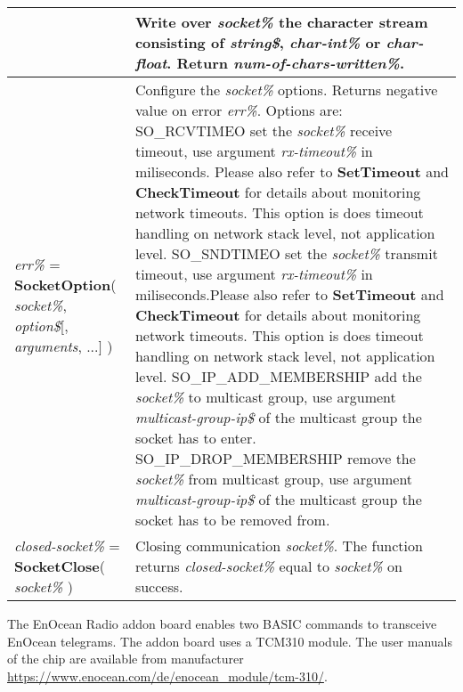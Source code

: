 \begin{table}[h!]
\begin{tabular}{|p{4cm}|p{10cm}|}
& Write over  \textit{socket\%} the character stream consisting of \textit{string\$}, \textit{char-int\%} or \textit{char-float}. Return \textit{num-of-chars-written\%}.
\\ \hline
\textit{err\%} = \textbf{SocketOption}( \textit{socket\%}, \textit{option\$}[, \textit{arguments}, ...] )
& Configure the \textit{socket\%} options. Returns negative value on error \textit{err\%}.\newline
Options are:\newline
SO\_RCVTIMEO set the \textit{socket\%} receive timeout, use argument \textit{rx-timeout\%} in miliseconds. Please also refer to \textbf{SetTimeout} and \textbf{CheckTimeout} for details about monitoring network timeouts. This option is does timeout handling on network stack level, not application level.\newline
SO\_SNDTIMEO set the \textit{socket\%} transmit timeout, use argument \textit{rx-timeout\%} in miliseconds.Please also refer to \textbf{SetTimeout} and \textbf{CheckTimeout} for details about monitoring network timeouts. This option is does timeout handling on network stack level, not application level.\newline
SO\_IP\_ADD\_MEMBERSHIP add the \textit{socket\%} to multicast group, use argument \textit{multicast-group-ip\$} of the multicast group the socket has to enter.\newline
SO\_IP\_DROP\_MEMBERSHIP remove the \textit{socket\%} from multicast group, use argument \textit{multicast-group-ip\$} of the multicast group the socket has to be removed from.\newline
\\ \hline
\textit{closed-socket\%} = \textbf{SocketClose}( \textit{socket\%} )
& Closing communication \textit{socket\%}. The function returns \textit{closed-socket\%} equal to \textit{socket\%} on success.
\\ \hline
\end{tabular}
\end{table}

The EnOcean Radio addon board enables two BASIC commands to transceive EnOcean telegrams. The addon board uses a TCM310 module. \newline
The user manuals of the chip are available from manufacturer
\url{https://www.enocean.com/de/enocean_module/tcm-310/}.\newline

